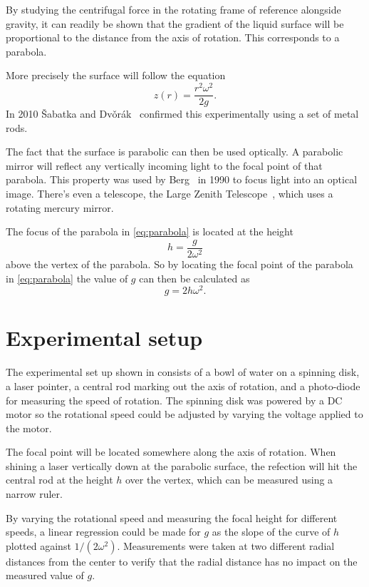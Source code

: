 \documentclass[11pt, a4paper, twocolumn, swedish, english]{article}
\begin{document}
By studying the centrifugal force in the rotating frame of reference
alongside gravity, it can readily be shown that the gradient of the
liquid surface will be proportional to the distance from the axis of
rotation. This corresponds to a parabola. 

More precisely the surface will follow the
equation~\cite{Berg1990} 
\begin{equation}\label{eq:parabola}
z(r)=\frac{r^2\omega^2}{2g}.
\end{equation}
In 2010 \v{S}abatka and
Dv\v{o}rák~\cite{Sabatka2010} confirmed this experimentally using a
set of metal rods. 

The fact that the surface is parabolic can then be used optically. A
parabolic mirror will reflect any vertically incoming light to the
focal point of that parabola. This property was used by
Berg~\cite{Berg1990} in 1990 to focus light into an optical
image. There's even a telescope, the Large Zenith
Telescope~\cite{LargeZenith}, which uses a rotating mercury mirror. 

The focus of the parabola in \eqref{eq:parabola} is located at the
height~\cite{Physics_Handbook} 
\begin{equation}
h=\frac{g}{2\omega^2}
\end{equation}
above the vertex of the parabola. So by locating the focal point of
the parabola in \eqref{eq:parabola} the value of $g$ can then be
calculated as 
\begin{equation}
g=2h\omega^2.
\end{equation}

\section{Experimental setup}

The experimental set up shown in  consists of a bowl of water
on a spinning disk, a laser pointer, a central rod marking out the axis of
rotation, and a photo-diode for measuring the speed of rotation. The spinning
disk was powered by a DC motor so the rotational speed could be
adjusted by varying the voltage applied to the motor. 

The focal point will be located somewhere along the axis of rotation. When
shining a laser vertically down at the parabolic surface, the refection will hit
the central rod at the height $h$ over the vertex, which can be measured
using a narrow ruler. 

By varying the rotational speed and measuring the focal height for
different speeds, a linear regression could be made for $g$ as the
slope of the curve of $h$ plotted against $1/(2\omega^2)$. 
Measurements were taken at two different radial distances from the
center to verify that the radial distance has no impact on the measured
value of $g$. 
\end{document}
